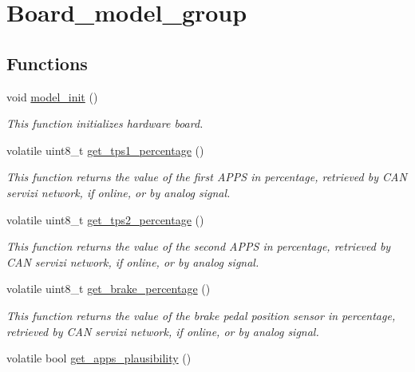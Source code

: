 \hypertarget{group___board__model__group}{}\section{Board\+\_\+model\+\_\+group}
\label{group___board__model__group}
\subsection*{Functions}
\begin{DoxyCompactItemize}
\item 
void \mbox{\hyperlink{group___board__model__group_gace5a444da39d4366693503c53f0841c2}{model\+\_\+init}} ()
\begin{DoxyCompactList}\small\item\em This function initializes hardware board. \end{DoxyCompactList}\item 
volatile uint8\+\_\+t \mbox{\hyperlink{group___board__model__group_ga9239a95f68fab3d9b6832fbe85eb87cd}{get\+\_\+tps1\+\_\+percentage}} ()
\begin{DoxyCompactList}\small\item\em This function returns the value of the first A\+P\+PS in percentage, retrieved by C\+AN servizi network, if online, or by analog signal. \end{DoxyCompactList}\item 
volatile uint8\+\_\+t \mbox{\hyperlink{group___board__model__group_gae563bbe9e3c31913df498ebd7cbf6c10}{get\+\_\+tps2\+\_\+percentage}} ()
\begin{DoxyCompactList}\small\item\em This function returns the value of the second A\+P\+PS in percentage, retrieved by C\+AN servizi network, if online, or by analog signal. \end{DoxyCompactList}\item 
volatile uint8\+\_\+t \mbox{\hyperlink{group___board__model__group_ga6db41e7368919bc4dfafaf4e400ae1a9}{get\+\_\+brake\+\_\+percentage}} ()
\begin{DoxyCompactList}\small\item\em This function returns the value of the brake pedal position sensor in percentage, retrieved by C\+AN servizi network, if online, or by analog signal. \end{DoxyCompactList}\item 
volatile bool \mbox{\hyperlink{group___board__model__group_gae0acabf32ee7f2a82b2f9149ba3d1978}{get\+\_\+apps\+\_\+plausibility}} ()

\end{DoxyCompactItemize}
